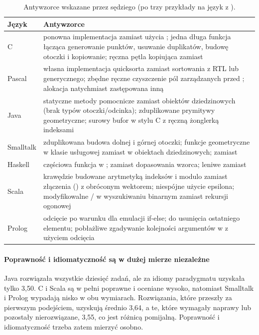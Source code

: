 \begin{table}[htbp]
  \centering
  \caption{Antywzorce wskazane przez sędziego (po trzy przykłady na język z ).}
  \label{tab:antipatterns}
  \small
  \begin{tabularx}{\textwidth}{@{}lY@{}}
    \toprule
    Język & Antywzorce \\
    \midrule
    C         & ponowna implementacja  zamiast użycia ; jedna długa funkcja łącząca generowanie punktów, usuwanie duplikatów, budowę otoczki i kopiowanie; ręczna pętla kopiująca zamiast  \\
    Pascal    & własna implementacja quicksorta zamiast sortowania z RTL lub generycznego; zbędne ręczne czyszczenie pól zarządzanych przed ; alokacja natychmiast zastępowana inną \\
    Java      & statyczne metody pomocnicze zamiast obiektów dziedzinowych (brak typów otoczki/odcinka); zduplikowane prymitywy geometryczne; surowy bufor  w stylu C z ręczną żonglerką indeksami \\
    Smalltalk & zduplikowana budowa dolnej i górnej otoczki; funkcje geometryczne w klasie usługowej zamiast w obiektach dziedzinowych;  zamiast  \\
    Haskell   & częściowa funkcja  w ;  zamiast dopasowania wzorca; leniwe  zamiast  \\
    Scala     & krawędzie budowane arytmetyką indeksów i modulo zamiast złączenia () z obróconym wektorem; niespójne użycie epsilona; modyfikowalne / w wyszukiwaniu binarnym zamiast rekursji ogonowej \\
    Prolog    & odcięcie po warunku dla emulacji if-else;  do usunięcia ostatniego elementu; pobłażliwe zgadywanie kolejności argumentów w  z użyciem odcięcia \\
    \bottomrule
  \end{tabularx}
\end{table}

\paragraph{Poprawność i idiomatyczność są w dużej mierze niezależne} Java rozwiązała wszystkie
dziesięć zadań, ale za idiomy paradygmatu uzyskała tylko 3,50. C i Scala są w pełni poprawne
i oceniane wysoko, natomiast Smalltalk i Prolog wypadają nisko w obu wymiarach. Rozwiązania, które
przeszły za pierwszym podejściem, uzyskują średnio 3,64, a te, które wymagały naprawy lub pozostały
nierozwiązane, 3,55, co jest różnicą pomijalną. Poprawność i idiomatyczność trzeba zatem mierzyć
osobno.

